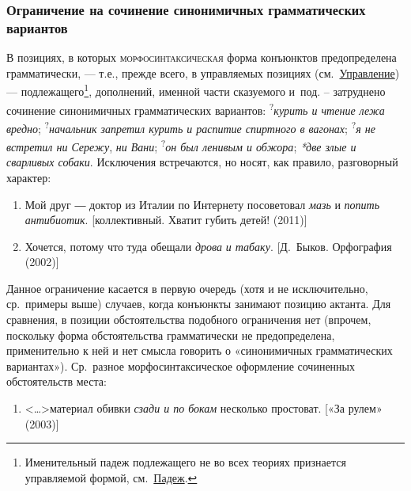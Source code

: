 \subsubsection{Ограничение на сочинение синонимичных грамматических
  вариантов}\label{ux43eux433ux440ux430ux43dux438ux447ux435ux43dux438ux435-ux43dux430-ux441ux43eux447ux438ux43dux435ux43dux438ux435-ux441ux438ux43dux43eux43dux438ux43cux438ux447ux43dux44bux445-ux433ux440ux430ux43cux43cux430ux442ux438ux447ux435ux441ux43aux438ux445-ux432ux430ux440ux438ux430ux43dux442ux43eux432}

В позициях, в которых \textsc{морфосинтаксическая} форма конъюнктов
предопределена грамматически, --- т.е., прежде всего, в управляемых
позициях (см.~\underline{Управление}) --- подлежащего\footnote{Именительный
  падеж подлежащего не во всех теориях признается управляемой формой,
  см.~\underline{Падеж}.}, дополнений, именной части сказуемого и~под.
-- затруднено сочинение синонимичных грамматических вариантов:
\textsuperscript{?}\textit{курить и чтение лежа вредно};
\textsuperscript{?}\textit{начальник запретил курить и распитие спиртного
  в вагонах}; \textsuperscript{?}\textit{я не встретил ни Сережу}, \textit{ни
  Вани}; \textsuperscript{?}\textit{он был ленивым и обжора}; \textit{*две
  злые и сварливых собаки}. Исключения встречаются, но носят, как правило,
разговорный характер:

\begin{enumerate}
  \def\labelenumi{(\arabic{enumi})}
  \setcounter{enumi}{1}
  \item
        Мой друг ― доктор из Италии по Интернету посоветовал \textit{мазь} и
        \textit{попить антибиотик}. {[}коллективный. Хватит губить детей!
        (2011){]}
  \item
        Хочется, потому что туда обещали \textit{дрова} \textit{и табаку}.
        {[}Д.~Быков. Орфография (2002){]}
\end{enumerate}

Данное ограничение касается в первую очередь (хотя и не исключительно,
ср.~примеры выше) случаев, когда конъюнкты занимают позицию актанта. Для
сравнения, в позиции обстоятельства подобного ограничения нет (впрочем,
поскольку форма обстоятельства грамматически не предопределена,
применительно к ней и нет смысла говорить о «синонимичных грамматических
вариантах»). Ср.~разное морфосинтаксическое оформление сочиненных
обстоятельств места:

\begin{enumerate}
  \def\labelenumi{(\arabic{enumi})}
  \setcounter{enumi}{3}
  \item
        \textless\ldots\textgreater материал обивки \textit{сзади и по бокам}
        несколько простоват. {[}«За рулем» (2003){]}
\end{enumerate}

